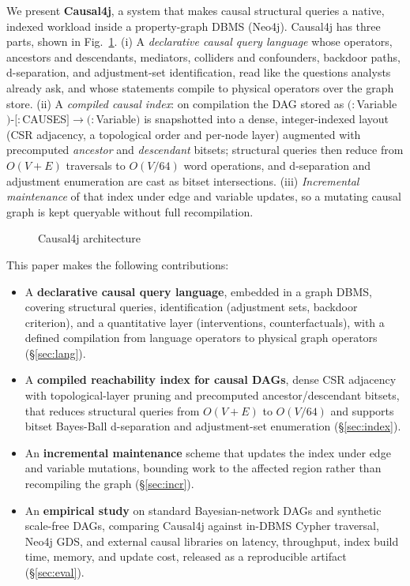 
We present \textbf{Causal4j}, a system that makes causal structural queries a
native, indexed workload inside a property-graph DBMS (Neo4j). Causal4j has
three parts, shown in Fig.~\ref{fig:arch}. (i) A \emph{declarative causal query
language} whose operators,  ancestors and descendants, mediators, colliders and
confounders, backdoor paths, d-separation, and adjustment-set
identification,  read like the questions analysts already ask, and whose
statements compile to physical operators over the graph store. (ii) A
\emph{compiled causal index}: on compilation the DAG stored as
$(:$\textsf{Variable}$)\text{-}[:$\textsf{CAUSES}$]\!\rightarrow\!(:$\textsf{Variable}$)$
is snapshotted into a dense, integer-indexed layout (CSR adjacency, a
topological order and per-node layer) augmented with precomputed
\emph{ancestor} and \emph{descendant} bitsets; structural queries then reduce
from $O(V{+}E)$ traversals to $O(V/64)$ word operations, and d-separation and
adjustment enumeration are cast as bitset intersections. (iii) \emph{Incremental
maintenance} of that index under edge and variable updates, so a mutating causal
graph is kept queryable without full recompilation.
\begin{figure}
    \centering
    \caption{Causal4j architecture}
    \label{fig:arch}
\end{figure}


This paper makes the following contributions:
\begin{itemize}
  \item A \textbf{declarative causal query language}, embedded in a graph DBMS,
  covering structural queries, identification (adjustment sets, backdoor
  criterion), and a quantitative layer (interventions, counterfactuals), with a
  defined compilation from language operators to physical graph operators
  (\S\ref{sec:lang}).
  \item A \textbf{compiled reachability index for causal DAGs},  dense CSR
  adjacency with topological-layer pruning and precomputed ancestor/descendant
  bitsets,  that reduces structural queries from $O(V{+}E)$ to $O(V/64)$ and
  supports bitset Bayes-Ball d-separation and adjustment-set enumeration
  (\S\ref{sec:index}).
  \item An \textbf{incremental maintenance} scheme that updates the index under
  edge and variable mutations, bounding work to the affected region rather than
  recompiling the graph (\S\ref{sec:incr}).
  \item An \textbf{empirical study} on standard Bayesian-network DAGs and
  synthetic scale-free DAGs, comparing Causal4j against in-DBMS Cypher traversal,
  Neo4j GDS, and external causal libraries on latency, throughput, index build
  time, memory, and update cost, released as a reproducible artifact
  (\S\ref{sec:eval}).
\end{itemize}

